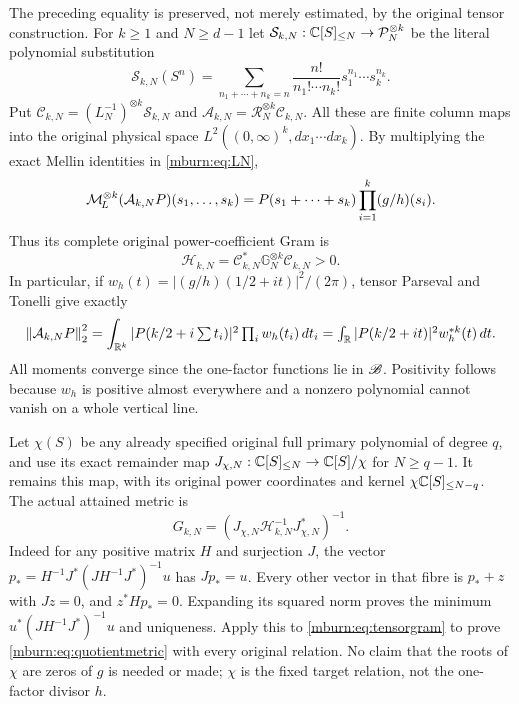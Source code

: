 \documentclass[11pt]{article}
\begin{document}
The preceding equality is preserved, not merely estimated, by
the original tensor construction. For $k\geq1$ and $N\geq d-1$
let $\mathcal S_{k,N}:\mathbb C[S]_{\leq N}\to\mathcal P_N^{\otimes k}$
be the literal polynomial substitution
\begin{equation}\label{mburn:eq:multinomial}
 \mathcal S_{k,N}(S^n)=
 \sum_{n_1+\cdots+n_k=n}\frac{n!}{n_1!\cdots n_k!}
                                  s_1^{n_1}\cdots s_k^{n_k}.
\end{equation}
Put $\mathcal C_{k,N}=(L_N^{-1})^{\otimes k}\mathcal S_{k,N}$
and $\mathcal A_{k,N}=\mathcal R_N^{\otimes k}\mathcal C_{k,N}$.
All these are finite column maps into the original physical
space $L^2((0,\infty)^k,dx_1\cdots dx_k)$. By multiplying
the exact Mellin identities in \eqref{mburn:eq:LN},
\begin{equation}\label{mburn:eq:tensorsource}
 \mathcal M_{\!L}^{\otimes k}(\mathcal A_{k,N}P)(s_1,\ldots,s_k)
           =P(s_1+\cdots+s_k)\prod_{i=1}^k(g/h)(s_i).
\end{equation}
Thus its complete original power-coefficient Gram is
\begin{equation}\label{mburn:eq:tensorgram}
 \mathcal H_{k,N}=\mathcal C_{k,N}^*
                    \mathbb G_N^{\otimes k}\mathcal C_{k,N}>0.
\end{equation}
In particular, if $w_h(t)=|(g/h)(1/2+it)|^2/(2\pi)$,
tensor Parseval and Tonelli give exactly
\begin{equation}\label{mburn:eq:convolutionmetric}
 \left\lVert\mathcal A_{k,N}P\right\rVert_2^2
  =\int_{\mathbb R^k}|P(k/2+i\textstyle\sum t_i)|^2
                       \prod_iw_h(t_i)\,dt_i
  =\int_\mathbb R|P(k/2+it)|^2w_h^{*k}(t)\,dt.
\end{equation}
All moments converge since the one-factor functions lie in
$\mathscr B$. Positivity follows because $w_h$ is positive almost
everywhere and a nonzero polynomial cannot vanish on a
whole vertical line.

Let $\chi(S)$ be any already specified original full primary
polynomial of degree $q$, and use its exact remainder map
$J_{\chi,N}:\mathbb C[S]_{\leq N}\to\mathbb C[S]/\chi$ for $N\geq q-1$.
It remains this map, with its original power coordinates and
kernel $\chi\mathbb C[S]_{\leq N-q}$. The actual attained metric is
\begin{equation}\label{mburn:eq:quotientmetric}
 G_{k,N}=\left(J_{\chi,N}\mathcal H_{k,N}^{-1}
                                           J_{\chi,N}^*\right)^{-1}.
\end{equation}
Indeed for any positive matrix $H$ and surjection $J$, the
vector $p_*=H^{-1}J^*(JH^{-1}J^*)^{-1}u$ has $Jp_*=u$.
Every other vector in that fibre is $p_*+z$ with $Jz=0$,
and $z^*Hp_*=0$. Expanding its squared norm proves the
minimum $u^*(JH^{-1}J^*)^{-1}u$ and uniqueness.
Apply this to \eqref{mburn:eq:tensorgram} to prove
\eqref{mburn:eq:quotientmetric} with every original relation.
No claim that the roots of $\chi$ are zeros of $g$ is needed
or made; $\chi$ is the fixed target relation, not the
one-factor divisor $h$.
\end{document}
